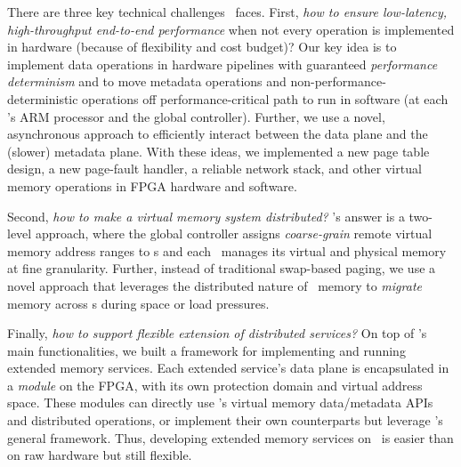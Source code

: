 There are three key technical challenges \sys\ faces.
First, {\em how to ensure low-latency, high-throughput end-to-end performance} 
when not every operation is implemented in hardware (because of flexibility and cost budget)?
Our key idea is to implement data operations in hardware pipelines with guaranteed 
{\em performance determinism} and to move metadata operations and 
non-performance-deterministic operations off performance-critical path 
to run in software (at each \MN's ARM processor and the global controller).
Further, we use a novel, asynchronous approach to efficiently interact between 
the data plane and the (slower) metadata plane.
With these ideas, we implemented a new page table design, a new page-fault handler,
a reliable network stack, and other virtual memory operations 
in FPGA hardware and software.

Second, {\em how to make a virtual memory system distributed?}
\sys's answer is a two-level approach, %
where the global controller assigns {\em coarse-grain} remote virtual memory address ranges to \MN{}s
and each \MN\ manages its virtual and physical memory at fine granularity.
Further, instead of traditional swap-based paging, we %
use a novel approach that leverages the distributed nature of \sys\ memory to {\em migrate} memory across \MN{}s
during space or load pressures.

Finally, {\em how to support flexible extension of distributed services?}
On top of \sys's main functionalities, 
we built a framework for implementing and running extended memory services.
Each extended service's data plane is encapsulated in a {\em module} on the FPGA,
with its own protection domain and virtual address space.
These modules can directly use \sys's virtual memory data/metadata APIs and distributed operations, %
or implement their own counterparts but leverage \sys's general framework. %
Thus, developing extended memory services on \sys\ is easier than on raw hardware but still flexible.


